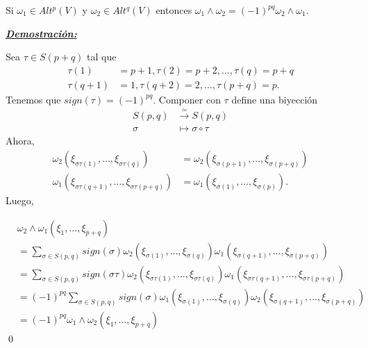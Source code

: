 \begin{Lem}
Si $\omega_1\in Alt^p(V)$ y $ \omega_2\in Alt^q(V)$ entonces $\omega_1\wedge \omega_2=(-1)^{pq}\omega_2\wedge \omega_1$. 
\end{Lem}

\underline{\textbf{\textit{Demostración:}}}

Sea $\tau\in S(p+q)$ tal que 
\begin{equation}
\begin{split}
\tau(1)&=p+1,\tau(2)=p+2,\dots,\tau(q)=p+q \\
\tau(q+1)&=1,\tau(q+2)=2,\dots,\tau(p+q)=p.
\end{split}
\end{equation}
Tenemos que $sign(\tau)=(-1)^{pq}$. Componer con $\tau$ define una biyección
\begin{equation}
\begin{split}
S(p,q) &\xrightarrow{\simeq}S(p,q) \\
\sigma &\mapsto \sigma \circ \tau
\end{split}
\end{equation}
Ahora,
\begin{equation}
\begin{split}
\omega_2(\xi_{\sigma\tau(1)},\dots,\xi_{\sigma\tau(q)})&= \omega_2(\xi_{\sigma(p+1)},\dots,\xi_{\sigma(p+q)}) \\
\omega_1(\xi_{\sigma\tau(q+1)},\dots,\xi_{\sigma\tau(p+q)})&=\omega_1(\xi_{\sigma(1)},\dots,\xi_{\sigma(p)}).
\end{split}
\end{equation}
Luego,

\begin{equation}
\begin{split}
&\omega_2\wedge \omega_1(\xi_1,\dots,\xi_{p+q}) \\
&= \sum_{\sigma\in S(p,q)}sign(\sigma)\omega_2(\xi_{\sigma(1)},\dots,\xi_{\sigma(q)})\omega_1(\xi_{\sigma(q+1)},\dots,\xi_{\sigma(p+q)}) \\
&= \sum_{\sigma\in S(p,q)} sign(\sigma \tau) \omega_2(\xi_{\sigma\tau(1)},\dots,\xi_{\sigma\tau(q)})\omega_1(\xi_{\sigma\tau(q+1)},\dots,\xi_{\sigma\tau(p+q)}) \\
&=(-1)^{pq}\sum_{\sigma\in S(p,q)} sign(\sigma) \omega_1(\xi_{\sigma(1)},\dots,\xi_{\sigma(q)})\omega_2(\xi_{\sigma(q+1)},\dots,\xi_{\sigma(p+q)}) \\
&= (-1)^{pq}\omega_1\wedge \omega_2(\xi_1,\dots,\xi_{p+q})
\end{split}
\end{equation}
\qed

